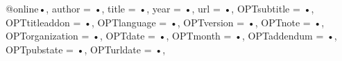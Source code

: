 @online{•,
author = {•},
title = {•},
year = {•},
url = {•},
OPTsubtitle = {•},
OPTtitleaddon = {•},
OPTlanguage = {•},
OPTversion = {•},
OPTnote = {•},
OPTorganization = {•},
OPTdate = {•},
OPTmonth = {•},
OPTaddendum = {•},
OPTpubstate = {•},
OPTurldate = {•},
}
